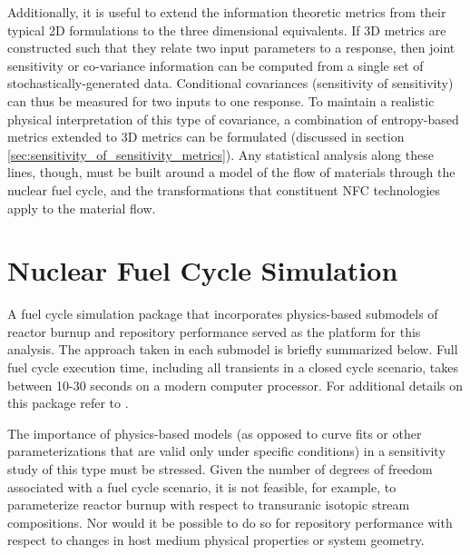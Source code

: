 \documentclass[a4paper, 12pt]{article}
\begin{document}
Additionally, it is useful to extend the information theoretic metrics from their typical 2D
formulations to the three dimensional equivalents.  If 3D metrics are constructed such that
they relate two input parameters to a response, then joint sensitivity or co-variance information
can be computed from a single set of stochastically-generated data.  Conditional covariances
(sensitivity of sensitivity) can thus be measured for two inputs to one response.
To maintain a realistic physical interpretation of this type of covariance, a combination of
entropy-based metrics extended to 3D metrics can be formulated  (discussed in section
\ref{sec:sensitivity_of_sensitivity_metrics}).  Any statistical analysis along these lines, though,
must be built around a model of the flow of materials through the nuclear fuel cycle, and the
transformations that constituent NFC technologies apply to the material flow.




\section{Nuclear Fuel Cycle Simulation}
\label{sec:nfcsim}

A fuel cycle simulation package that incorporates physics-based submodels of reactor burnup \cite{Scopatz2009} and
repository performance \cite{Li2009} served as the platform for this analysis. The approach taken in each
submodel is briefly summarized below. Full fuel cycle execution time, including all transients in a closed cycle
scenario, takes between 10-30 seconds on a modern computer processor. For additional details on this package 
refer to \cite{Li2009b}.

The importance of physics-based models (as opposed to curve fits or other parameterizations that are valid
only under specific conditions) in a sensitivity study of this type must be stressed. Given the number of
degrees of freedom associated with a fuel cycle scenario, it is not feasible, for example, to parameterize
reactor burnup with respect to transuranic isotopic stream compositions. Nor would it be possible to do
so for repository performance with respect to changes in host medium physical properties or system
geometry.
\end{document}
